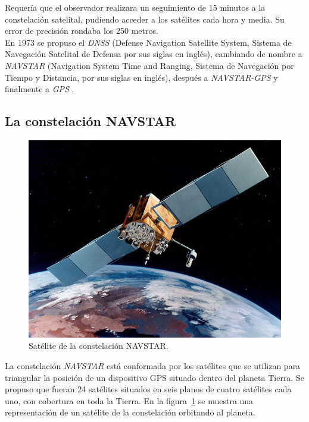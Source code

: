 Requería que el observador realizara un seguimiento de 15 minutos a la constelación satelital, pudiendo acceder a los satélites cada hora y media. Su error de precisión rondaba los 250 metros.\\

En 1973 se propuso el \textit{DNSS} (Defense Navigation Satellite System, Sistema de Navegación Satelital de Defensa por sus siglas en inglés), cambiando de nombre a \textit{NAVSTAR} (Navigation System Time and Ranging, Sistema de Navegación por Tiempo y Distancia, por sus siglas en inglés), después a \textit{NAVSTAR-GPS} y finalmente a \textit{GPS} \citep{termal2014prototipo}.

\subsection{La constelación NAVSTAR}

\begin{figure}[H]
\centering
\includegraphics[scale=0.95]{Figures/Navstar}
\caption[Satélite de la constelación NAVSTAR.]{Satélite de la constelación NAVSTAR\footnotemark.}
\label{fig:NAV}
\end{figure}


La constelación \textit{NAVSTAR} está conformada por los satélites que se utilizan para triangular la posición de un dispositivo GPS situado dentro del planeta Tierra. Se propuso que fueran 24 satélites situados en seis planos de cuatro satélites cada uno, con cobertura en toda la Tierra. En la figura~\ref{fig:NAV} se muestra una representación de un satélite de la constelación orbitando al planeta.\\

